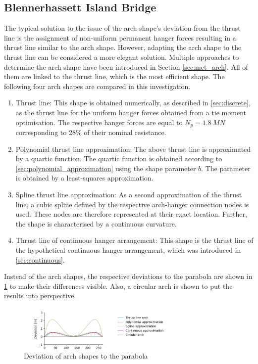 \subsection{Blennerhassett Island Bridge} \label{sec:arch_shape_BIB}
The typical solution to the issue of the arch shape's deviation from the thrust line is the assignment of non-uniform permanent hanger forces resulting in a thrust line similar to the arch shape. However, adapting the arch shape to the thrust line can be considered a more elegant solution. 
Multiple approaches to determine the arch shape have been introduced in Section \ref{sec:met_arch}. All of them are linked to the thrust line, which is the most efficient shape. The following four arch shapes are compared in this investigation.
\begin{enumerate}
    \item Thrust line: This shape is obtained numerically, as described in \cref{sec:discrete}, as the thrust line for the uniform hanger forces obtained from a tie moment optimisation. The respective hanger forces are equal to $N_p=\SI{1.8}{MN}$ corresponding to 28\% of their nominal resistance.
    \item Polynomial thrust line approximation: The above thrust line is approximated by a quartic function. The quartic function is obtained according to \cref{sec:polynomial_approximation} using the shape parameter $b$. The parameter is obtained by a least-squares approximation. 

    \item Spline thrust line approximation: As a second approximation of the thrust line, a cubic spline defined by the respective arch-hanger connection nodes is used. These nodes are therefore represented at their exact location. Further, the shape is characterised by a continuous curvature.
    \item Thrust line of continuous hanger arrangement: This shape is the thrust line of the hypothetical continuous hanger arrangement, which was introduced in \cref{sec:continuous}.
\end{enumerate}

Instead of the arch shapes, the respective deviations to the parabola are shown in \cref{fig:arch_shapes_13} to make their differences visible. 
Also, a circular arch is shown to put the results into perspective.

\begin{figure}[H]
    \centering
    \includegraphics[trim={1cm 0 3cm 0.45cm},clip, width=0.79\textwidth]{calculations/arch shape/arch_shapes_13.png}
    \caption{Deviation of arch shapes to the parabola}
    \label{fig:arch_shapes_13}
\end{figure}


